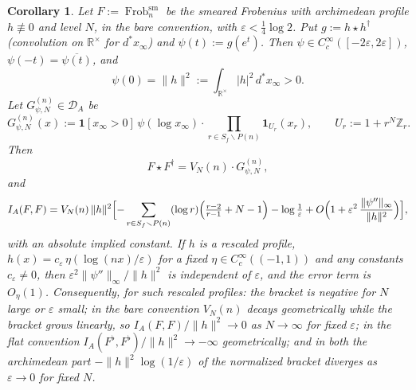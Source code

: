 \documentclass[11pt]{amsart}
\newtheorem{corollary}[theorem]{Corollary}
\theoremstyle{definition}
\theoremstyle{remark}
\newcommand{\R}{\mathbb R}
\newcommand{\Z}{\mathbb Z}
\newcommand{\Frob}{\operatorname{Frob}}
\newcommand{\DA}{\mathcal D_A}
\begin{document}
\begin{corollary}\label{cor:gramdiagconv}
Let $F:=\Frob_n^{\mathrm{sm}}$ be the smeared Frobenius with archimedean
profile $h\not\equiv0$ and level $N$, in the bare convention, with
$\varepsilon<\tfrac14\log2$. Put $g:=h\star h^\dagger$ (convolution on
$\R^\times$ for $d^*x_\infty$) and $\psi(t):=g(e^t)$. Then $\psi\in
C_c^\infty([-2\varepsilon,2\varepsilon])$, $\psi(-t)=\overline{\psi(t)}$, and
\[
  \psi(0)=\|h\|^2:=\int_{\R^\times}|h|^2\,d^*x_\infty>0 .
\]
Let $G^{(n)}_{\psi,N}\in\DA$ be
\[
  G^{(n)}_{\psi,N}(x):=\mathbf 1[x_\infty>0]\,\psi(\log x_\infty)\cdot
     \prod_{r\in S_f\smallsetminus P(n)}\mathbf 1_{U_r}(x_r),\qquad
  U_r:=1+r^N\Z_r .
\]
Then
\begin{equation}\label{eq:FFdagger}
  F\star F^\dagger=V_N(n)\cdot G^{(n)}_{\psi,N},
\end{equation}
and
\begin{equation}\label{eq:diagvalue}
  I_A(F,F)=V_N(n)\,\|h\|^2\Bigl[-\sum_{r\in S_f\smallsetminus P(n)}(\log r)
    \Bigl(\tfrac{r-2}{r-1}+N-1\Bigr)-\log\tfrac1\varepsilon
    +O\Bigl(1+\varepsilon^2\,\frac{\|\psi''\|_\infty}{\|h\|^2}\Bigr)\Bigr],
\end{equation}
with an absolute implied constant. If $h$ is a rescaled profile,
$h(x)=c_\varepsilon\,\eta(\log(nx)/\varepsilon)$ for a fixed
$\eta\in C_c^\infty((-1,1))$ and any constants $c_\varepsilon\neq0$, then
$\varepsilon^2\|\psi''\|_\infty/\|h\|^2$ is independent of $\varepsilon$, and
the error term is $O_\eta(1)$. Consequently, for such rescaled profiles:
the bracket is negative for $N$ large or $\varepsilon$ small; in the bare convention $V_N(n)$ decays
geometrically while the bracket grows linearly, so $I_A(F,F)/\|h\|^2\to0$ as
$N\to\infty$ for fixed $\varepsilon$; in the flat convention
$I_A(F^\flat,F^\flat)/\|h\|^2\to-\infty$ geometrically; and in both the
archimedean part $-\|h\|^2\log(1/\varepsilon)$ of the normalized bracket
diverges as $\varepsilon\to0$ for fixed $N$.
\end{corollary}
\end{document}

